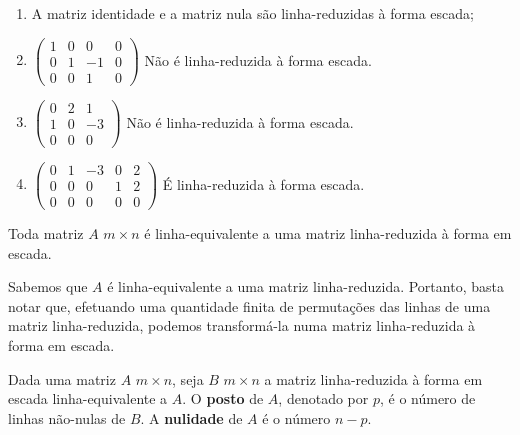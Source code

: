\begin{exemplo}
	\begin{enumerate}
		\item  A matriz identidade e a matriz nula s\~ao linha-reduzidas \`a forma escada;
		\item $\begin{pmatrix}
			1 & 0 & 0 & 0\\
			0 & 1 & -1 & 0\\
			0 & 0 & 1 & 0
		\end{pmatrix}$ N\~ao \'e linha-reduzida \`a forma escada.
		\item $\begin{pmatrix}
			0 & 2 & 1\\
			1 & 0 & -3\\
			0 & 0 & 0
		\end{pmatrix}$ N\~ao \'e linha-reduzida \`a forma escada.
		\item $\begin{pmatrix}
			0 & 1 & -3 & 0 & 2\\
			0 & 0 & 0 & 1 & 2\\
			0 & 0 & 0 & 0 & 0
		\end{pmatrix}$ \'E linha-reduzida \`a forma escada.
	\end{enumerate}
\end{exemplo}

\begin{teorema}
	Toda matriz $A$ $m \times n$ \'e linha-equivalente a uma matriz linha-reduzida \`a forma em escada.
\end{teorema}
\begin{prova}
	Sabemos que $A$ \'e linha-equivalente a uma matriz linha-reduzida. Portanto, basta notar que, efetuando uma quantidade finita de permuta\c{c}\~oes das linhas de uma matriz linha-reduzida, podemos transform\'a-la numa matriz linha-reduzida \`a forma em escada.
\end{prova}

\begin{definicao}
	Dada uma matriz $A$ $m \times n$, seja $B$ $m \times n$ a matriz linha-reduzida \`a forma em escada linha-equivalente a $A$. O \textbf{posto} de $A$, denotado por $p$, \'e o n\'umero de linhas n\~ao-nulas de $B$. A \textbf{nulidade} de $A$ \'e o n\'umero $n - p$.
\end{definicao}

